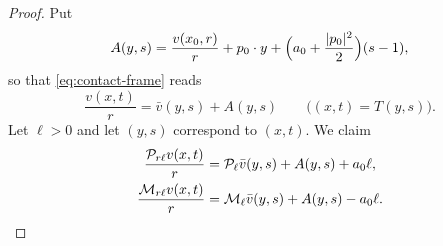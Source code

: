 \begin{proof}
Put
\[
  A(y,s)=\frac{v(x_0,r)}{r}+p_0\cdot y
             +\Bigl(a_0+\frac{|p_0|^2}{2}\Bigr)(s-1),
\]
so that \eqref{eq:contact-frame} reads
\begin{equation}\label{eq:fec-split}
  \frac{v(x,t)}{r}=\bar v(y,s)+A(y,s)
  \qquad\bigl((x,t)=T(y,s)\bigr).
\end{equation}
Let $\ell>0$ and let $(y,s)$ correspond to $(x,t)$. We claim
\begin{equation}\label{eq:envelope-covariance}
\begin{split}
  \frac{\mathcal{P}_{r\ell}v(x,t)}{r}
    &=\mathcal{P}_\ell\bar v(y,s)+A(y,s)+a_0\ell,\\
  \frac{\mathcal{M}_{r\ell}v(x,t)}{r}
    &=\mathcal{M}_\ell\bar v(y,s)+A(y,s)-a_0\ell .
\end{split}
\end{equation}


\end{proof}
